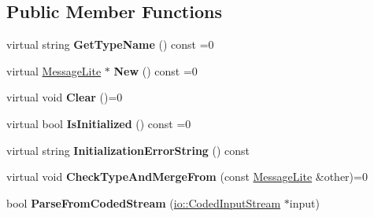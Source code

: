 \subsection*{Public Member Functions}
\begin{DoxyCompactItemize}
\item 
\mbox{\label{classgoogle_1_1protobuf_1_1MessageLite_a9bc0ee1b979ef7d7906ff899913525e6}} 
virtual string {\bfseries Get\+Type\+Name} () const =0
\item 
\mbox{\label{classgoogle_1_1protobuf_1_1MessageLite_ac56f702622baf4bc8b5fe7ea6f66c6cc}} 
virtual \hyperlink{classgoogle_1_1protobuf_1_1MessageLite}{Message\+Lite} $\ast$ {\bfseries New} () const =0
\item 
\mbox{\label{classgoogle_1_1protobuf_1_1MessageLite_a76c6fc63bd2a7be4b9220cbf243b81fb}} 
virtual void {\bfseries Clear} ()=0
\item 
\mbox{\label{classgoogle_1_1protobuf_1_1MessageLite_af4482fa58b3ada0b35fd8e79b2bd0387}} 
virtual bool {\bfseries Is\+Initialized} () const =0
\item 
\mbox{\label{classgoogle_1_1protobuf_1_1MessageLite_a8ea72a881ece69cddad4e9f78b7075be}} 
virtual string {\bfseries Initialization\+Error\+String} () const
\item 
\mbox{\label{classgoogle_1_1protobuf_1_1MessageLite_a77c1e2ece518d215e3d8b3fe6830bcfb}} 
virtual void {\bfseries Check\+Type\+And\+Merge\+From} (const \hyperlink{classgoogle_1_1protobuf_1_1MessageLite}{Message\+Lite} \&other)=0
\item 
\mbox{\label{classgoogle_1_1protobuf_1_1MessageLite_a5875371d09bca5c4d75c793ad7be5bb6}} 
bool {\bfseries Parse\+From\+Coded\+Stream} (\hyperlink{classgoogle_1_1protobuf_1_1io_1_1CodedInputStream}{io\+::\+Coded\+Input\+Stream} $\ast$input)
\item 
\mbox{\label{classgoogle_1_1protobuf_1_1MessageLite_a5a2d379792185751116ffa1726e626bb}} 

\end{DoxyCompactItemize}
